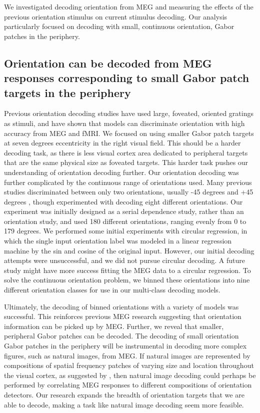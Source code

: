 \documentclass[../main.tex]{subfiles}
\begin{document}
We investigated decoding orientation from MEG and measuring the effects of the previous orientation stimulus on current stimulus decoding. Our analysis particularly focused on decoding with small, continuous orientation, Gabor patches in the periphery. 


\subsection{Orientation can be decoded from MEG responses corresponding to small Gabor patch targets in the periphery}
Previous orientation decoding studies \citep{haynes_rees_2005, kamitani_tong_2005, GARCIA2013515, cichy_ramirez_pantazis_2015} have used large, foveated, oriented gratings as stimuli, and have shown that models can discriminate orientation with high accuracy from MEG and fMRI. We focused on using smaller Gabor patch targets at seven degrees eccentricity in the right visual field. This should be a harder decoding task, as there is less visual cortex area dedicated to peripheral targets that are the same physical size as foveated targets. This harder task pushes our understanding of orientation decoding further. Our orientation decoding was further complicated by the continuous range of orientations used. Many previous studies discriminated between only two orientations, usually -45 degrees and +45 degrees \citep{cichy_ramirez_pantazis_2015}, though \cite{kamitani_tong_2005} experimented with decoding eight different orientations. Our experiment was initially designed as a serial dependence study, rather than an orientation study, and used 180 different orientations, ranging evenly from 0 to 179 degrees.  We performed some initial experiments with circular regression, in which the single input orientation label was modeled in a linear regression machine by the sin and cosine of the original input. However, our initial decoding attempts were unsuccessful, and we did not pursue circular decoding. A future study might have more success fitting the MEG data to a circular regression. To solve the continuous orientation problem, we binned these orientations into nine different orientation classes for use in our multi-class decoding models.

Ultimately, the decoding of binned orientations with a variety of models was successful. This reinforces previous MEG research suggesting that orientation information can be picked up by MEG. Further, we reveal that smaller, peripheral Gabor patches can be decoded. The decoding of small orientation Gabor patches in the periphery will be instrumental in decoding more complex figures, such as natural images, from MEG. If natural images are represented by compositions of spatial frequency patches of varying size and location throughout the visual cortex, as suggested by \cite{OLSHAUSEN19973311}, then natural image decoding could perhaps be performed by correlating MEG responses to different compositions of orientation detectors. Our research expands the breadth of orientation targets that we are able to decode, making a task like natural image decoding seem more feasible. 
\end{document}
